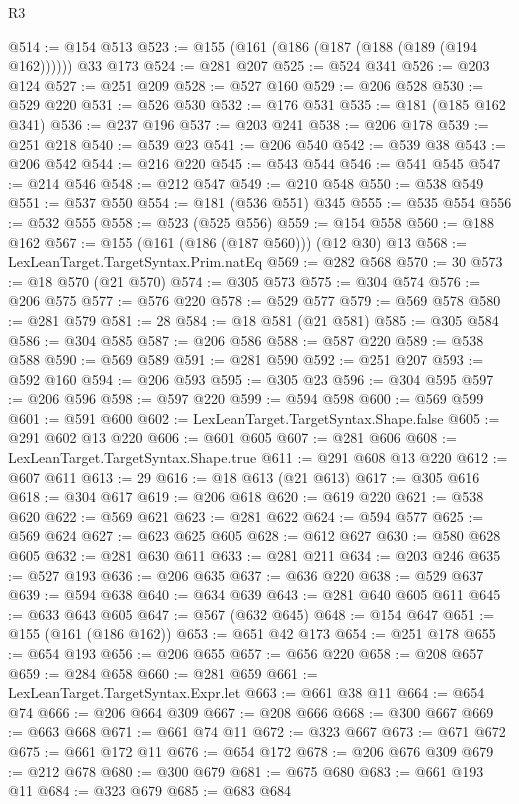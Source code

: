 \begin{lexlean}{R3}
\begin{coremodule}
@514 := @154 @513
@523 := @155 (@161 (@186 (@187 (@188 (@189 (@194 @162)))))) @33 @173
@524 := @281 @207
@525 := @524 @341
@526 := @203 @124
@527 := @251 @209
@528 := @527 @160
@529 := @206 @528
@530 := @529 @220
@531 := @526 @530
@532 := @176 @531
@535 := @181 (@185 @162 @341)
@536 := @237 @196
@537 := @203 @241
@538 := @206 @178
@539 := @251 @218
@540 := @539 @23
@541 := @206 @540
@542 := @539 @38
@543 := @206 @542
@544 := @216 @220
@545 := @543 @544
@546 := @541 @545
@547 := @214 @546
@548 := @212 @547
@549 := @210 @548
@550 := @538 @549
@551 := @537 @550
@554 := @181 (@536 @551) @345
@555 := @535 @554
@556 := @532 @555
@558 := @523 (@525 @556)
@559 := @154 @558
@560 := @188 @162
@567 := @155 (@161 (@186 (@187 @560))) (@12 @30) @13
@568 := LexLeanTarget.TargetSyntax.Prim.natEq
@569 := @282 @568
@570 := 30
@573 := @18 @570 (@21 @570)
@574 := @305 @573
@575 := @304 @574
@576 := @206 @575
@577 := @576 @220
@578 := @529 @577
@579 := @569 @578
@580 := @281 @579
@581 := 28
@584 := @18 @581 (@21 @581)
@585 := @305 @584
@586 := @304 @585
@587 := @206 @586
@588 := @587 @220
@589 := @538 @588
@590 := @569 @589
@591 := @281 @590
@592 := @251 @207
@593 := @592 @160
@594 := @206 @593
@595 := @305 @23
@596 := @304 @595
@597 := @206 @596
@598 := @597 @220
@599 := @594 @598
@600 := @569 @599
@601 := @591 @600
@602 := LexLeanTarget.TargetSyntax.Shape.false
@605 := @291 @602 @13 @220
@606 := @601 @605
@607 := @281 @606
@608 := LexLeanTarget.TargetSyntax.Shape.true
@611 := @291 @608 @13 @220
@612 := @607 @611
@613 := 29
@616 := @18 @613 (@21 @613)
@617 := @305 @616
@618 := @304 @617
@619 := @206 @618
@620 := @619 @220
@621 := @538 @620
@622 := @569 @621
@623 := @281 @622
@624 := @594 @577
@625 := @569 @624
@627 := @623 @625 @605
@628 := @612 @627
@630 := @580 @628 @605
@632 := @281 @630 @611
@633 := @281 @211
@634 := @203 @246
@635 := @527 @193
@636 := @206 @635
@637 := @636 @220
@638 := @529 @637
@639 := @594 @638
@640 := @634 @639
@643 := @281 @640 @605 @611
@645 := @633 @643 @605
@647 := @567 (@632 @645)
@648 := @154 @647
@651 := @155 (@161 (@186 @162))
@653 := @651 @42 @173
@654 := @251 @178
@655 := @654 @193
@656 := @206 @655
@657 := @656 @220
@658 := @208 @657
@659 := @284 @658
@660 := @281 @659
@661 := LexLeanTarget.TargetSyntax.Expr.let
@663 := @661 @38 @11
@664 := @654 @74
@666 := @206 @664 @309
@667 := @208 @666
@668 := @300 @667
@669 := @663 @668
@671 := @661 @74 @11
@672 := @323 @667
@673 := @671 @672
@675 := @661 @172 @11
@676 := @654 @172
@678 := @206 @676 @309
@679 := @212 @678
@680 := @300 @679
@681 := @675 @680
@683 := @661 @193 @11
@684 := @323 @679
@685 := @683 @684

\end{coremodule}
\end{lexlean}
